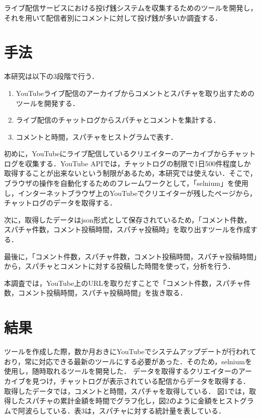 \documentclass[uplatex,twocolumn]{jsarticle}
\begin{document}
ライブ配信サービスにおける投げ銭システムを収集するためのツールを開発し，それを用いて配信者別にコメントに対して投げ銭が多いか調査する．

\section{手法}

本研究は以下の3段階で行う．

\begin{enumerate}
 \item YouTubeライブ配信のアーカイブからコメントとスパチャを取り出すためのツールを開発する．
 \item ライブ配信のチャットログからスパチャとコメントを集計する．
 \item コメントと時間，スパチャをヒストグラムで表す．
\end{enumerate}

初めに，YouTubeにライブ配信しているクリエイターのアーカイブからチャットログを収集する．YouTube APIでは，チャットログの制限で1日500件程度しか取得することが出来ないという制限があるため，本研究では使えない\cite{04}．そこで，ブラウザの操作を自動化するためのフレームワークとして，「selnium」を使用し，インターネットブラウザ上のYouTubeでクリエイターが残したページから，チャットログのデータを取得する．

次に，取得したデータはjson形式として保存されているため，「コメント件数，スパチャ件数，コメント投稿時間，スパチャ投稿時」を取り出すツールを作成する．

最後に，「コメント件数，スパチャ件数，コメント投稿時間，スパチャ投稿時間」から，スパチャとコメントに対する投稿した時間を使って，分析を行う．

本調査では，YouTube上のURLを取りだすことで「コメント件数，スパチャ件数，コメント投稿時間，スパチャ投稿時間」を抜き取る．

\section{結果}

ツールを作成した際，数か月おきにYouTubeでシステムアップデートが行われており，常に対応できる最新のツールにする必要があった．そのため，selniumを使用し，随時取れるツールを開発した．
データを取得するクリエイターのアーカイブを見つけ，チャットログが表示されている配信からデータを取得する．
取得したデータでは，コメントと時間，スパチャを取得している．
図1では，取得したスパチャの累計金額を時間でグラフ化し，図2のように金額をヒストグラムで阿波らしている．表3は，スパチャに対する統計量を表している．
\end{document}
